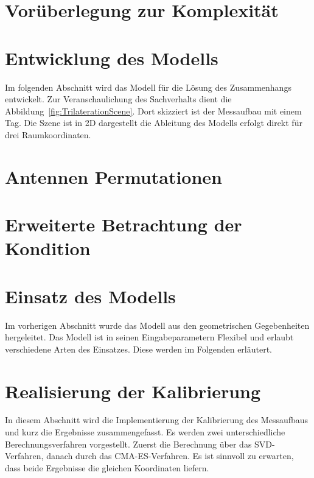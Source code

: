 \section{Vorüberlegung zur Komplexität}
\label{sec:Komplexity1}

%
\section{Entwicklung des Modells}
\label{sec:model_developement}
Im folgenden Abschnitt wird das Modell für die Lösung des Zusammenhangs entwickelt. Zur Veranschaulichung des Sachverhalts dient die Abbildung~\ref{fig:TrilaterationScene}. Dort skizziert ist der Messaufbau mit einem Tag. Die Szene ist in 2D dargestellt die Ableitung des Modells erfolgt direkt für drei Raumkoordinaten.
%

%
\section{Antennen Permutationen}

%
\section{Erweiterte Betrachtung der Kondition}
%

%
\section{Einsatz des Modells}
\label{sec:use_of_model}
Im vorherigen Abschnitt wurde das Modell aus den geometrischen Gegebenheiten hergeleitet. Das Modell ist in seinen Eingabeparametern Flexibel und erlaubt verschiedene Arten des Einsatzes. Diese werden im Folgenden erläutert.
%

%
\section{Realisierung der Kalibrierung}
\label{sec:calibration}
In diesem Abschnitt wird die Implementierung der Kalibrierung des Messaufbaus und kurz die Ergebnisse zusammengefasst. Es werden zwei unterschiedliche Berechnungsverfahren vorgestellt. Zuerst die Berechnung über das SVD-Verfahren, danach durch das CMA-ES-Verfahren. Es ist sinnvoll zu erwarten, dass beide Ergebnisse die gleichen Koordinaten liefern.
%

%
